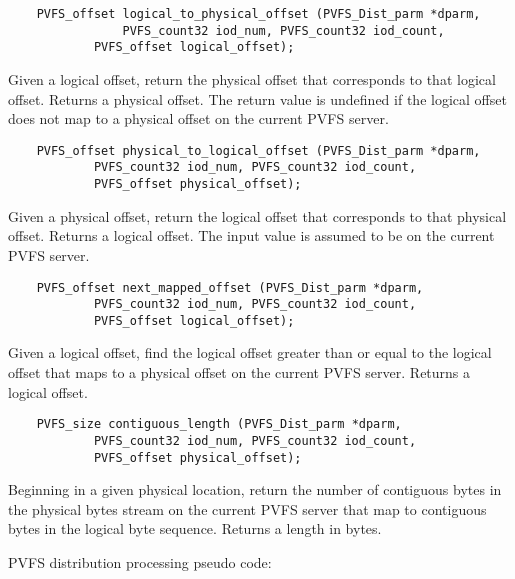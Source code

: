 \documentclass[11pt]{article}
\begin{document}
\begin{verbatim}
   	PVFS_offset logical_to_physical_offset (PVFS_Dist_parm *dparm,
        		PVFS_count32 iod_num, PVFS_count32 iod_count,
         	PVFS_offset logical_offset);
\end{verbatim}

Given a logical offset, return the physical offset that corresponds to
that logical offset.  Returns a physical offset.  The return value is
undefined if the logical offset does not map to a physical offset on
the current PVFS server.

\begin{verbatim}
   	PVFS_offset physical_to_logical_offset (PVFS_Dist_parm *dparm,
         	PVFS_count32 iod_num, PVFS_count32 iod_count,
         	PVFS_offset physical_offset);
\end{verbatim}

Given a physical offset, return the logical offset that corresponds to
that physical offset.  Returns a logical offset.  The input value is
assumed to be on the current PVFS server.

\begin{verbatim}
   	PVFS_offset next_mapped_offset (PVFS_Dist_parm *dparm,
         	PVFS_count32 iod_num, PVFS_count32 iod_count,
         	PVFS_offset logical_offset);
\end{verbatim}

Given a logical offset, find the logical offset greater than or equal
to the logical offset that maps to a physical offset on the current
PVFS server.  Returns a logical offset.

\begin{verbatim}
   	PVFS_size contiguous_length (PVFS_Dist_parm *dparm,
         	PVFS_count32 iod_num, PVFS_count32 iod_count,
         	PVFS_offset physical_offset);
\end{verbatim}

Beginning in a given physical location, return the number of contiguous
bytes in the physical bytes stream on the current PVFS server that map
to contiguous bytes in the logical byte sequence.  Returns a length in bytes.

PVFS distribution processing pseudo code:
\end{document}
